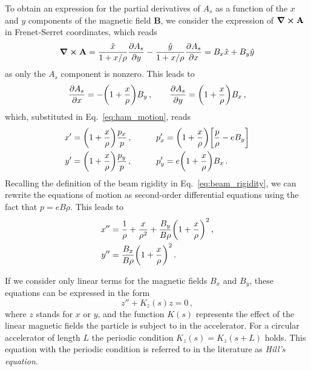 To obtain an expression for the partial derivatives of $A_s$ as a function of the $x$ and $y$ components of the magnetic field $\mathbf{B}$, we consider the expression of $\curl \mathbf{A}$ in Frenet-Serret coordinates, which reads
%
\begin{equation}
    \curl \mathbf{A} = \frac{\hat x}{1+x/\rho}\pdv{A_s}{y} - \frac{\hat y}{1+x/\rho}\pdv{A_s}{x} = B_x\hat x + B_y\hat y %
\end{equation}
%
as only the $A_s$ component is nonzero. This leads to
%
\begin{equation}
    \pdv{A_s}{x} = -\qty(1+\frac{x}{\rho})B_y\,, \qquad \pdv{A_s}{y} = \qty(1+\frac{x}{\rho})B_x\,,
\end{equation}
%
which, substituted in Eq.~\eqref{eq:ham_motion}, reads
%
\begin{equation} 
    \begin{aligned}
        x' &= \qty(1+\frac{x}{\rho})\frac{p_x}{p}\,, &\qquad p'_x &= \qty(1+\frac{x}{\rho})\qty[ \frac{p}{\rho} - eB_y]\\
        y' &= \qty(1+\frac{x}{\rho})\frac{p_y}{p}\,, &\qquad p'_y &= e\qty(1+\frac{x}{\rho})B_x\,.
    \end{aligned}
\end{equation}
%
Recalling the definition of the beam rigidity in Eq.~\eqref{eq:beam_rigidity}, we can rewrite the equations of motion as second-order differential equations using the fact that $p=eB\rho$. This leads to
%
\begin{equation}
    \begin{split}
        x'' &= \frac{1}{\rho} + \frac{x}{\rho^2} + \frac{B_y}{B\rho}\qty(1+\frac{x}{\rho})^2\,,\\
        y'' &= \frac{B_x}{B\rho}\qty(1+\frac{x}{\rho})^2\,.
    \end{split}
    \label{eq:acc_step_1}
\end{equation} 

If we consider only linear terms for the magnetic fields $B_x$ and $B_y$, these equations can be expressed in the form 
\begin{equation}
	z''+K_z(s)z = 0\, ,
    \label{eq:acc_step_2}
\end{equation}
where $z$ stands for $x$ or $y$, and the function $K(s)$ represents the effect of the linear magnetic fields the particle is subject to in the accelerator.  For a circular accelerator of length $L$ the periodic condition $K_z(s)=K_z(s+L)$ holds. This equation with the periodic condition is referred to in the literature as \textit{Hill's equation}.


